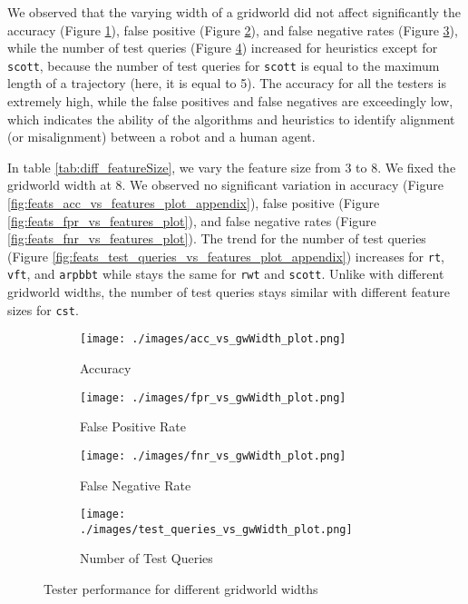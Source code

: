 We observed that the varying width of a gridworld did not affect significantly the accuracy (Figure \ref{fig:acc_vs_gwWidth_plot_appendix_appendix}), false positive (Figure \ref{fig:fpr_vs_gwWidth_plot}), and false negative rates (Figure \ref{fig:fnr_vs_gwWidth_plot}), while the number of test queries (Figure \ref{fig:test_queries_vs_gwWidth_plot_appendix}) increased for heuristics except for \texttt{scott}, because the number of test queries for \texttt{scott} is equal to the maximum length of a trajectory (here, it is equal to 5). The accuracy for all the testers is extremely high, while the false positives and false negatives are exceedingly low, which indicates the ability of the algorithms and heuristics to identify alignment (or misalignment) between a robot and a human agent.

In table \ref{tab:diff_featureSize}, we vary the feature size from 3 to 8. We fixed the gridworld width at 8. We observed no significant variation in accuracy (Figure \ref{fig:feats_acc_vs_features_plot_appendix}), false positive (Figure \ref{fig:feats_fpr_vs_features_plot}), and false negative rates (Figure \ref{fig:feats_fnr_vs_features_plot}). The trend for the number of test queries (Figure \ref{fig:feats_test_queries_vs_features_plot_appendix}) increases for \texttt{rt}, \texttt{vft}, and \texttt{arpbbt} while stays the same for \texttt{rwt} and \texttt{scott}. Unlike with different gridworld widths, the number of test queries stays similar with different feature sizes for \texttt{cst}. 

\begin{figure}[!ht]
     \centering
     \begin{subfigure}[!ht]{0.4\textwidth}
         \centering
         \texttt{[image: ./images/acc\_vs\_gwWidth\_plot.png]}
         \caption{Accuracy}
         \label{fig:acc_vs_gwWidth_plot_appendix_appendix}
     \end{subfigure}
    \hspace{5mm}
     \begin{subfigure}[!ht]{0.4\textwidth}
         \centering
         \texttt{[image: ./images/fpr\_vs\_gwWidth\_plot.png]}
         \caption{False Positive Rate}
         \label{fig:fpr_vs_gwWidth_plot}
     \end{subfigure}
     \hspace{5mm}
     \begin{subfigure}[!ht]{0.4\textwidth}
         \centering
         \texttt{[image: ./images/fnr\_vs\_gwWidth\_plot.png]}
         \caption{False Negative Rate}
         \label{fig:fnr_vs_gwWidth_plot}
     \end{subfigure}
     \hspace{5mm}
    \begin{subfigure}[!ht]{0.4\textwidth}
         \centering
         \texttt{[image: ./images/test\_queries\_vs\_gwWidth\_plot.png]}
         \caption{Number of Test Queries}
         \label{fig:test_queries_vs_gwWidth_plot_appendix}
     \end{subfigure}
    \caption{Tester performance for different gridworld widths}
    \label{fig:tester_perf_diff_gwWidth_appendix}
\end{figure}

